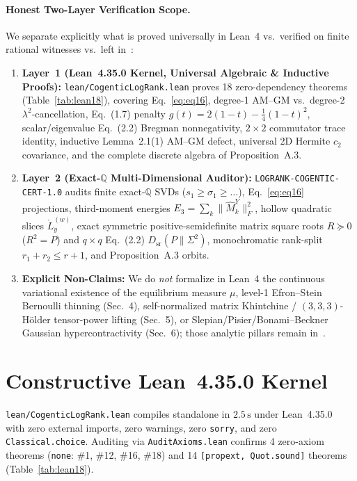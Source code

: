 \documentclass[10pt,twocolumn]{article}
\newcommand{\QQ}{\mathbb{Q}}
\begin{document}
\paragraph{Honest Two-Layer Verification Scope.}
We separate explicitly what is proved universally in Lean~4 vs.\ verified on finite rational witnesses vs.\ left in~\cite{cogentic2026logrank}:
\begin{enumerate}[leftmargin=1.2em,itemsep=1pt,topsep=2pt]
  \item \textbf{Layer~1 (Lean~4.35.0 Kernel, Universal Algebraic \& Inductive Proofs):} \nolinkurl{lean/CogenticLogRank.lean} proves 18 zero-dependency theorems (Table~\ref{tab:lean18}), covering Eq.~\eqref{eq:eq16}, degree-1 AM--GM vs.\ degree-2 $\lambda^2$-cancellation, Eq.~(1.7) penalty $g(t)=2(1-t)-\frac14(1-t)^2$, scalar/eigenvalue Eq.~(2.2) Bregman nonnegativity, $2\times 2$ commutator trace identity, inductive Lemma~2.1(1) AM--GM defect, universal 2D Hermite $c_2$ covariance, and the complete discrete algebra of Proposition~A.3.
  \item \textbf{Layer~2 (Exact-$\QQ$ Multi-Dimensional Auditor):} \nolinkurl{LOGRANK-COGENTIC-CERT-1.0} audits finite exact-$\QQ$ SVDs ($s_1\ge\sigma_1\ge\dots$), Eq.~\eqref{eq:eq16} projections, third-moment energies $E_3 = \sum_k\|\widehat{M}^Y_k\|_F^2$, hollow quadratic slices $\mathring{L}_y^{(w)}$, exact symmetric positive-semidefinite matrix square roots $R\succeq 0$ ($R^2=P$) and $q\times q$ Eq.~(2.2) $D_{\mathrm{sr}}(P\|\Sigma^2)$, monochromatic rank-split $r_1+r_2\le r+1$, and Proposition~A.3 orbits.
  \item \textbf{Explicit Non-Claims:} We do \emph{not} formalize in Lean~4 the continuous variational existence of the equilibrium measure $\mu$, level-1 Efron--Stein Bernoulli thinning (Sec.~4), self-normalized matrix Khintchine / $(3,3,3)$-H\"older tensor-power lifting (Sec.~5), or Slepian/Pisier/Bonami--Beckner Gaussian hypercontractivity (Sec.~6); those analytic pillars remain in~\cite{cogentic2026logrank}.
\end{enumerate}

\section{Constructive Lean~4.35.0 Kernel}\label{sec:lean}
\texttt{lean/CogenticLogRank.lean} compiles standalone in $2.5\,\mathrm{s}$ under Lean~4.35.0~\cite{demoura2021lean4} with zero external imports, zero warnings, zero \texttt{sorry}, and zero \texttt{Classical.choice}. Auditing via \texttt{AuditAxioms.lean} confirms 4 zero-axiom theorems (\texttt{none}: \#1, \#12, \#16, \#18) and 14 \texttt{[propext, Quot.sound]} theorems (Table~\ref{tab:lean18}).
\end{document}

